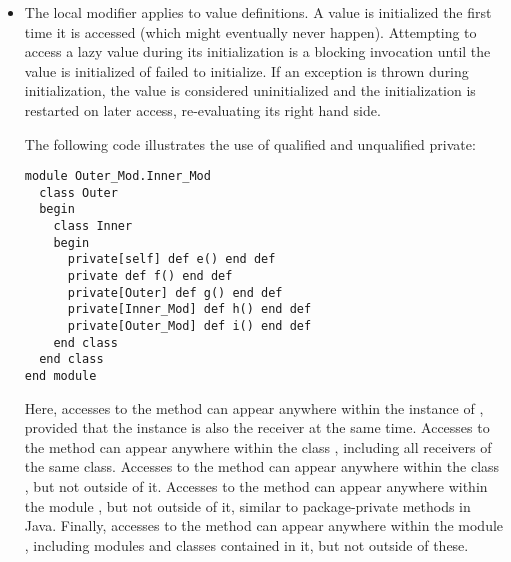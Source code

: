 \begin{itemize}
  \item The  local modifier applies to value definitions. A  value is initialized the first time it is accessed (which might eventually never happen). Attempting to access a lazy value during its initialization is a blocking invocation until the value is initialized of failed to initialize. If an exception is thrown during initialization, the value is considered uninitialized and the initialization is restarted on later access, re-evaluating its right hand side. 

\example The following code illustrates the use of qualified and unqualified private: 
\begin{lstlisting}
module Outer_Mod.Inner_Mod
  class Outer
  begin
    class Inner
    begin
      private[self] def e() end def
      private def f() end def
      private[Outer] def g() end def
      private[Inner_Mod] def h() end def
      private[Outer_Mod] def i() end def
    end class
  end class
end module
\end{lstlisting}
Here, accesses to the method  can appear anywhere within the instance of , provided that the instance is also the receiver at the same time. Accesses to the method  can appear anywhere within the class , including all receivers of the same class. Accesses to the method  can appear anywhere within the class , but not outside of it. Accesses to the method  can appear anywhere within the module , but not outside of it, similar to package-private methods in Java. Finally, accesses to the method  can appear anywhere within the module , including modules and classes contained in it, but not outside of these.

\end{itemize}

